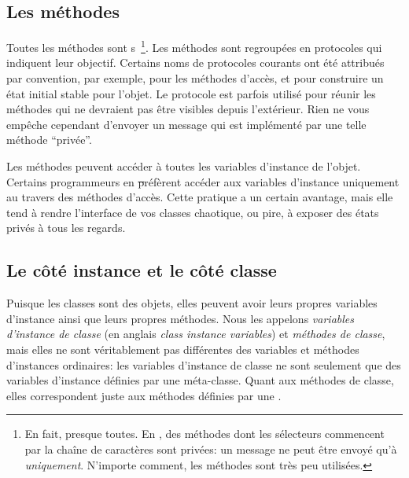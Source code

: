\documentclass[a4paper,10pt,twoside]{book}
\begin{document}
\subsection{Les méthodes}

Toutes les méthodes sont s~\footnote{En fait, presque toutes.  En \pharo, des méthodes dont les sélecteurs commencent par
la chaîne de caractères  sont privées: un message 
ne peut être envoyé qu'à \self \emph{uniquement}.  N'importe comment, les méthodes  sont très peu utilisées.}.
Les méthodes sont regroupées en protocoles qui indiquent leur objectif.
Certains noms de protocoles courants ont été attribués par convention,
par exemple,  pour les méthodes d'accès, et  pour construire un état initial stable pour l'objet.
Le protocole  est parfois utilisé pour réunir les
méthodes qui ne devraient pas être visibles depuis l'extérieur.
Rien ne vous empêche cependant d'envoyer un message qui est implémenté
par une telle méthode ``privée''.

Les méthodes peuvent accéder à toutes les variables d'instance de l'objet.
Certains programmeurs en \st préfèrent accéder aux variables d'instance
uniquement au travers des méthodes d'accès.
Cette pratique a un certain avantage, mais elle tend à rendre l'interface de vos classes chaotique, ou pire, à exposer des états privés à tous les regards.

\subsection{Le côté instance et le côté classe}

Puisque les classes sont des objets, elles peuvent avoir leurs propres variables d'instance ainsi que leurs propres méthodes.
Nous les appelons \emph{variables d'instance de classe} (en anglais \emph{class instance variables}) et \emph{méthodes de classe}, mais elles ne sont véritablement pas différentes des variables et méthodes d'instances ordinaires:
les variables d'instance de classe ne sont seulement que des variables d'instance définies par une méta-classe. Quant aux méthodes de classe,
elles correspondent juste aux méthodes définies par une . 
\end{document}
